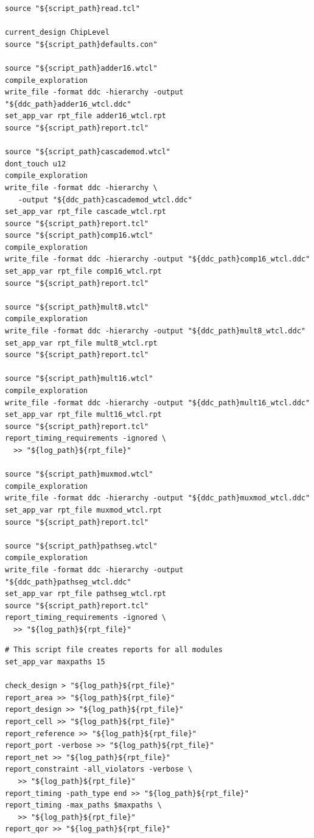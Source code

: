 \begin{lstlisting}[caption={recompile.tcl},label=ex:recompile]
source "${script_path}read.tcl"

current_design ChipLevel
source "${script_path}defaults.con"

source "${script_path}adder16.wtcl"
compile_exploration
write_file -format ddc -hierarchy -output "${ddc_path}adder16_wtcl.ddc"
set_app_var rpt_file adder16_wtcl.rpt
source "${script_path}report.tcl"

source "${script_path}cascademod.wtcl"
dont_touch u12
compile_exploration
write_file -format ddc -hierarchy \
   -output "${ddc_path}cascademod_wtcl.ddc"
set_app_var rpt_file cascade_wtcl.rpt
source "${script_path}report.tcl"
source "${script_path}comp16.wtcl"
compile_exploration
write_file -format ddc -hierarchy -output "${ddc_path}comp16_wtcl.ddc"
set_app_var rpt_file comp16_wtcl.rpt
source "${script_path}report.tcl"

source "${script_path}mult8.wtcl"
compile_exploration
write_file -format ddc -hierarchy -output "${ddc_path}mult8_wtcl.ddc"
set_app_var rpt_file mult8_wtcl.rpt
source "${script_path}report.tcl"

source "${script_path}mult16.wtcl"
compile_exploration
write_file -format ddc -hierarchy -output "${ddc_path}mult16_wtcl.ddc"
set_app_var rpt_file mult16_wtcl.rpt
source "${script_path}report.tcl"
report_timing_requirements -ignored \
  >> "${log_path}${rpt_file}"

source "${script_path}muxmod.wtcl"
compile_exploration
write_file -format ddc -hierarchy -output "${ddc_path}muxmod_wtcl.ddc"
set_app_var rpt_file muxmod_wtcl.rpt
source "${script_path}report.tcl"

source "${script_path}pathseg.wtcl"
compile_exploration
write_file -format ddc -hierarchy -output "${ddc_path}pathseg_wtcl.ddc"
set_app_var rpt_file pathseg_wtcl.rpt
source "${script_path}report.tcl"
report_timing_requirements -ignored \
  >> "${log_path}${rpt_file}"
\end{lstlisting}

\begin{lstlisting}[caption={report.tcl},label=ex:report-tcl]
# This script file creates reports for all modules
set_app_var maxpaths 15

check_design > "${log_path}${rpt_file}"
report_area >> "${log_path}${rpt_file}"
report_design >> "${log_path}${rpt_file}"
report_cell >> "${log_path}${rpt_file}"
report_reference >> "${log_path}${rpt_file}"
report_port -verbose >> "${log_path}${rpt_file}"
report_net >> "${log_path}${rpt_file}"
report_constraint -all_violators -verbose \
   >> "${log_path}${rpt_file}"
report_timing -path_type end >> "${log_path}${rpt_file}"
report_timing -max_paths $maxpaths \
   >> "${log_path}${rpt_file}"
report_qor >> "${log_path}${rpt_file}"
\end{lstlisting}
